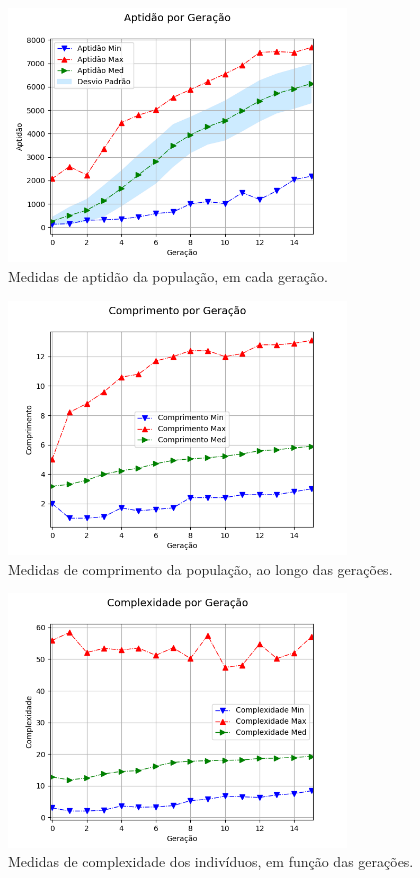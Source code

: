 \begin{figure}[H]
	\centering
	\includegraphics[width=0.8\textwidth]{02_desenvolvimento/04_EC_Fig_DPAptGer.png}
	\caption{Medidas de aptidão da população, em cada geração.}
	\label{fig:4ec-dpaptger}
\end{figure}

\begin{figure}[H]
	\centering
	\includegraphics[width=0.8\textwidth]{02_desenvolvimento/04_EC_Fig_DPCompr.png}
	\caption{Medidas de comprimento da população, ao longo das gerações.}
	\label{fig:4ec-dpcompr}
\end{figure}

\begin{figure}[H]
	\centering
	\includegraphics[width=0.8\textwidth]{02_desenvolvimento/04_EC_Fig_DPCompl.png}
	\caption{Medidas de complexidade dos indivíduos, em função das gerações.}
	\label{fig:4ec-dpcompl}
\end{figure}

